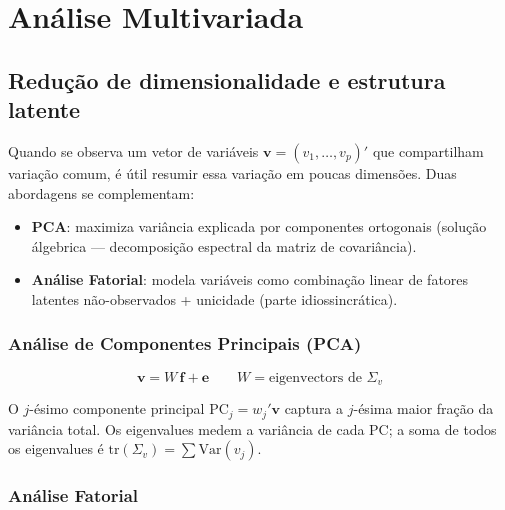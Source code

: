 \chapter{Análise Multivariada}
\label{cap:multivariada}

\section{Redução de dimensionalidade e estrutura latente}

Quando se observa um vetor de variáveis $\mathbf{v} = (v_1,\ldots,v_p)'$
que compartilham variação comum, é útil resumir essa variação em poucas
dimensões. Duas abordagens se complementam:

\begin{itemize}
  \item \textbf{PCA}: maximiza variância explicada por componentes ortogonais
  (solução álgebrica — decomposição espectral da matriz de covariância).
  \item \textbf{Análise Fatorial}: modela variáveis como combinação linear de
  fatores latentes não-observados + unicidade (parte idiossincrática).
\end{itemize}

\subsection*{Análise de Componentes Principais (PCA)}

\[
  \mathbf{v} = W\,\mathbf{f} + \mathbf{e}
  \qquad W = \text{eigenvectors de } \Sigma_v
\]

O $j$-ésimo componente principal $\text{PC}_j = w_j'\mathbf{v}$ captura a
$j$-ésima maior fração da variância total. Os eigenvalues medem a variância
de cada PC; a soma de todos os eigenvalues é $\mathrm{tr}(\Sigma_v) = \sum \mathrm{Var}(v_j)$.

\subsection*{Análise Fatorial}

